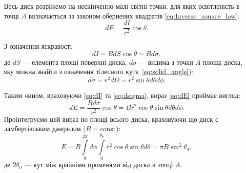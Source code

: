 
\begin{solutionexample}
    \begin{center}
        
    \end{center}

    Весь диск розріжемо на нескінченно малі світні точки, для яких освітленість в точці $A$ визначається за законом обернених квадратів \eqref{eq:Inverse_square_low}:
    \begin{equation}\label{eq:dE}
        dE = \frac{dI}{r^2}\cos\theta.
    \end{equation}

    З означення яскравості
    \begin{equation}\label{eq:dI}
        dI = BdS\cos\theta = Bd\sigma,
    \end{equation}
    де $dS$ ---  елемента площі поверхні диска, $d\sigma$ --- видима з точки $A$  площа диска,
    яку можна знайти з означення тілесного кута~\eqref{eq:solid_angle}):
    \begin{equation}\label{eq:dsigma}
        d\sigma = r^2 d\Omega = r^2 \sin\theta d\theta d\phi.
    \end{equation}


    Таким чином, враховуючи \eqref{eq:dI} та \eqref{eq:dsigma}, вираз \eqref{eq:dE} приймає вигляд:
    \begin{equation*}
        dE = \frac{Bd\sigma}{r^2}\cos\theta = B r^2 \cos\theta\sin\theta d\theta d\phi.
    \end{equation*}
    Проінтегруємо цей вираз по площі всього диска, враховуючи що диск є ламбертівським джерелом ($B = \mathrm{const}$):
    \begin{equation}\label{eq_ex:E}
        E =  B \int\limits_0^{2\pi} d\phi \int\limits_0^{\theta_0}  r^2 \cos\theta\sin\theta d\theta = \pi B \sin^2\theta_0,
    \end{equation}
    де $2\theta_0$ --- кут між крайніми променями від  диска в точці $A$.


\end{solutionexample}
